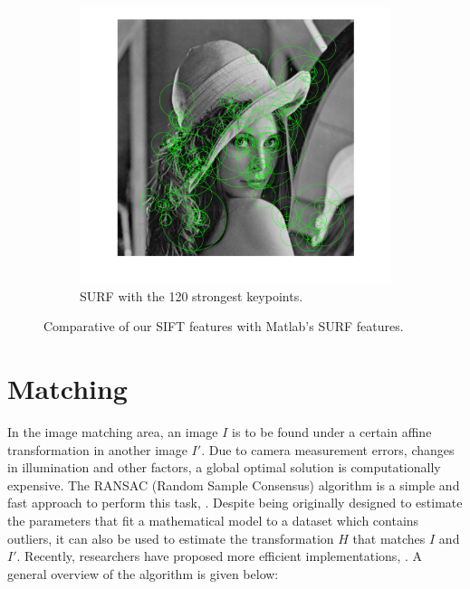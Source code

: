 \documentclass[12pt]{article}
\begin{document}
\begin{figure}[htbp!]
\begin{subfigure}[b]{0.49\textwidth}
                \label{fig:surf1}
        \end{subfigure}
        \begin{subfigure}[b]{0.49\textwidth}
                \includegraphics[width=\textwidth]{images/surf2}
                \caption{SURF with the 120 strongest keypoints.}
                \label{fig:surf2}
        \end{subfigure}        
        \caption{Comparative of our SIFT features with Matlab's SURF features.}\label{fig:featuresSample}
\end{figure}

\FloatBarrier %
\section{Matching}

In the image matching area, an image $I$ is to be found under a certain affine transformation in another image $I'$.
Due to camera measurement errors, changes in illumination and other factors, a global optimal solution is computationally expensive.
The RANSAC (Random Sample Consensus) algorithm is a simple and fast approach to perform this task, \cite{Fischler1981}.
Despite being originally designed to estimate the parameters that fit a mathematical model to a dataset which contains outliers, it can also be used to estimate the transformation $H$ that matches $I$ and $I'$.
Recently, researchers have proposed more efficient implementations, \cite{Dung2013}.
A general overview of the algorithm is given below:
\end{document}
